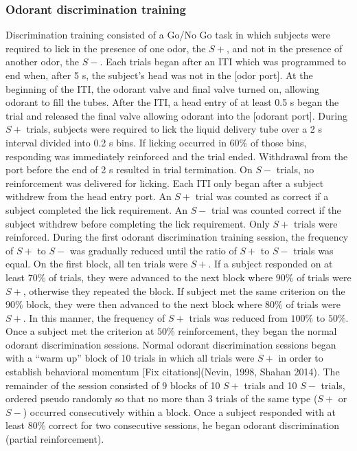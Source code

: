 \subsubsection{Odorant discrimination training}
Discrimination training consisted of a Go/No Go task in which subjects were required to lick in the presence of one odor, the $S+$, and not in the presence of another odor, the $S-$.  Each trials began after an ITI which was programmed to end when, after 5 s, the subject’s head was not in the [odor port]. At the beginning of the ITI, the odorant valve and final valve turned on, allowing odorant to fill the tubes. After the ITI, a head entry of at least 0.5 s began the trial and released the final valve allowing odorant into the [odorant port]. During $S+$ trials, subjects were required to lick the liquid delivery tube over a 2 s interval divided into 0.2 s bins. If licking occurred in $60\%$ of those bins, responding was immediately reinforced and the trial ended. Withdrawal from the port before the end of 2 s resulted in trial termination. On $S-$ trials, no reinforcement was delivered for licking. Each ITI only began after a subject withdrew from the head entry port. An $S+$ trial was counted as correct if a subject completed the lick requirement. An $S-$ trial was counted correct if the subject withdrew before completing the lick requirement. Only $S+$ trials were reinforced.
During the first odorant discrimination training session, the frequency of $S+$ to $S-$ was gradually reduced until the ratio of $S+$ to $S-$ trials was equal. On the first block, all ten trials were $S+$. If a subject responded on at least $70\%$ of trials, they were advanced to the next block where $90\%$ of trials were $S+$, otherwise they repeated the block. If subject met the same criterion on the $90\%$ block, they were then advanced to the next block where $80\%$ of trials were $S+$. In this manner, the frequency of $S+$ trials was reduced from $100\%$ to $50\%$.  Once a subject met the criterion at $50\%$ reinforcement, they began the normal odorant discrimination sessions.
Normal odorant discrimination sessions began with a ``warm up'' block of 10 trials in which all trials were $S+$ in order to establish behavioral momentum [Fix citations](Nevin, 1998, Shahan 2014).  The remainder of the session consisted of 9 blocks of 10 $S+$ trials and 10 $S-$ trials, ordered pseudo randomly so that no more than 3 trials of the same type ($S+$ or $S-$) occurred consecutively within a block. Once a subject responded with at least $80\%$ correct for two consecutive sessions, he began odorant discrimination (partial reinforcement).

